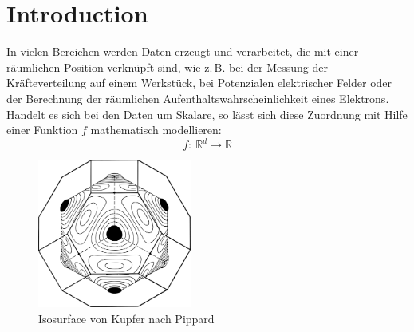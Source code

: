 \chapter{Introduction}
\label{chapter:intro}


In vielen Bereichen werden Daten erzeugt und verarbeitet, die mit einer räumlichen Position verknüpft sind, wie z.\,B. bei der Messung der Kräfteverteilung auf einem Werkstück, bei Potenzialen elektrischer Felder oder der Berechnung der räumlichen Aufenthaltswahrscheinlichkeit eines Elektrons. Handelt es sich bei den Daten um Skalare, so lässt sich diese Zuordnung mit Hilfe einer Funktion $ f $ mathematisch modellieren:
\[ f:~ \mathbb{R}^d \rightarrow \mathbb{R} \]

\begin{figure}[h!]
\centering
\includegraphics[width=0.45\textwidth]{graphics/fermi_copper_pippard}%
\caption[Isosurface von Kupfer nach Pippard]{Isosurface von Kupfer nach Pippard \cite{Pippard1957}}%
\label{fig:fermi_copper_pippard}%
\end{figure}